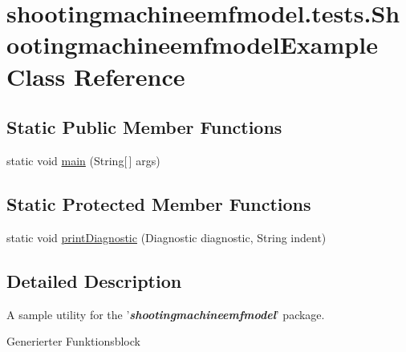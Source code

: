 \hypertarget{classshootingmachineemfmodel_1_1tests_1_1_shootingmachineemfmodel_example}{\section{shootingmachineemfmodel.\-tests.\-Shootingmachineemfmodel\-Example Class Reference}
\label{classshootingmachineemfmodel_1_1tests_1_1_shootingmachineemfmodel_example}
}
\subsection*{Static Public Member Functions}
\begin{DoxyCompactItemize}
\item 
static void \hyperlink{classshootingmachineemfmodel_1_1tests_1_1_shootingmachineemfmodel_example_a5a517143132b8c81102fb18fd9bb7333}{main} (String\mbox{[}$\,$\mbox{]} args)
\end{DoxyCompactItemize}
\subsection*{Static Protected Member Functions}
\begin{DoxyCompactItemize}
\item 
static void \hyperlink{classshootingmachineemfmodel_1_1tests_1_1_shootingmachineemfmodel_example_aeebc564e883a936dddecc592c3c2da91}{print\-Diagnostic} (Diagnostic diagnostic, String indent)
\end{DoxyCompactItemize}


\subsection{Detailed Description}
A sample utility for the '{\itshape {\bfseries shootingmachineemfmodel}}' package.

Generierter Funktionsblock 

